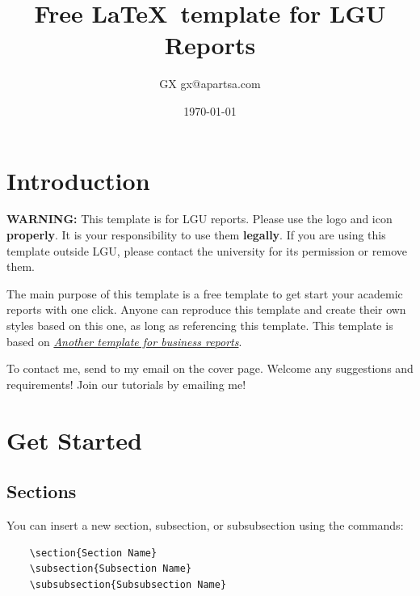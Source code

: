 \documentclass[12pt]{article}
\title{Free \LaTeX\ template for LGU Reports}
\author{GX \newline 120000000 \newline gx@apartsa.com}
\date{\today}
\begin{document}
\maketitle

\tableofcontents
\clearpage

\section{Introduction}

\textbf{WARNING:} This template is for LGU reports. Please use the logo and icon \textbf{properly}. It is your responsibility to use them \textbf{legally}. If you are using this template outside LGU, please contact the university for its permission or remove them.

The main purpose of this template is a free template to get start your academic reports with one click. Anyone can reproduce this template and create their own styles based on this one, as long as referencing this template. This template is based on \href{https://www.overleaf.com/latex/templates/another-template-for-business-reports/jjqkjjmcptkg}{\textit{Another template for business reports}}.

To contact me, send to my email on the cover page. Welcome any suggestions and requirements! Join our tutorials by emailing me!

\section{Get Started}

\subsection{Sections}

You can insert a new section, subsection, or subsubsection using the commands:

\begin{verbatim}
    \section{Section Name}
    \subsection{Subsection Name}
    \subsubsection{Subsubsection Name}
\end{verbatim}
\end{document}
